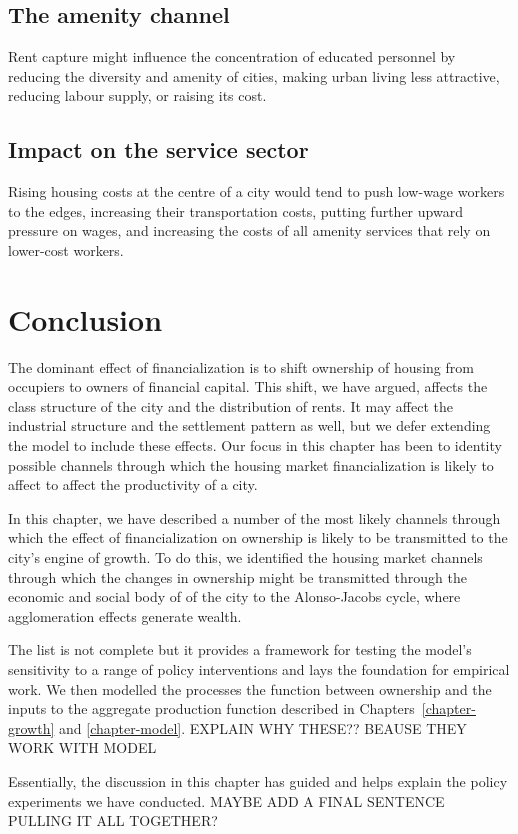 \subsection{The amenity channel}
Rent capture might influence the concentration of educated personnel by reducing the diversity and amenity of cities, making urban living less attractive, reducing labour supply, or raising its cost.



\subsection{Impact on the service sector}
Rising housing costs at the centre of a city would tend to push low-wage workers to the edges, increasing their transportation costs, putting further upward pressure on wages, and increasing the costs of all amenity services that rely on lower-cost workers.



\section{Conclusion}
The dominant effect of financialization is to shift ownership of housing from occupiers to owners of financial capital. This shift, we have argued, affects the class structure of the city and the distribution of rents. It may affect the industrial structure and the settlement pattern as well, but we defer extending the model to include these effects. Our focus in this chapter has been to identity possible channels through which the housing market financialization is likely to affect to affect the productivity of a city.  

{\color{red} In this chapter, we have described a number of the most likely channels through which the effect of financialization on ownership is likely to be transmitted to the city's engine of growth. To do this, we identified the housing market channels through which the changes in ownership might be transmitted through the economic and social body of of the city to the Alonso-Jacobs cycle, where agglomeration effects generate wealth. 

The list is not complete but it provides a framework for testing the model's sensitivity to a range of policy interventions and lays the foundation for empirical work. 
We then modelled the processes the function between ownership and the inputs to the aggregate production function described in Chapters~\ref{chapter-growth} and \ref{chapter-model}. EXPLAIN WHY THESE?? BEAUSE THEY WORK WITH MODEL

Essentially, the discussion in this chapter has guided and helps explain the policy experiments we have conducted. MAYBE ADD A FINAL SENTENCE PULLING IT ALL TOGETHER?}





